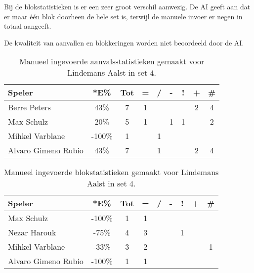 Bij de blokstatistieken is er een zeer groot verschil aanwezig. De AI geeft aan dat er maar één blok doorheen de hele set is, terwijl de manuele invoer er negen in totaal aangeeft.

De kwaliteit van aanvallen en blokkeringen worden niet beoordeeld door de AI. 

\begin{table}[ht!]
    \centering
    \scriptsize
    \begin{tabular}{|l|c|c|c|c|c|c|c|c|}
        \hline
        \textbf{Speler} & *E\% & Tot & = & / & - & ! & + & \# \\ \hline
        Berre Peters & 43\% & 7 & 1 &  &  & & 2 & 4 \\ 
        Max Schulz & 20\% & 5 & 1 &  & 1 & 1 & & 2 \\ 
        Mihkel Varblane & -100\% & 1 &  & 1 &  &  &  & \\ 
        Alvaro Gimeno Rubio & 43\% & 7 &  & 1 & & & 2 & 4 \\ \hline
    \end{tabular}
    \caption[Manueel ingevoerde aanvalsstatistieken gemaakt Lindemans Aalst in set 4]{\label{tab:PL3AttAalstMan4}Manueel ingevoerde aanvalsstatistieken gemaakt voor Lindemans Aalst in set 4.}
\end{table}

\begin{table}[ht!]
    \centering
    \scriptsize
    \begin{tabular}{|l|c|c|c|c|c|c|c|c|}
        \hline
        \textbf{Speler} & *E\% & Tot & = & / & - & ! & + & \# \\ \hline
        Max Schulz & -100\% & 1 & 1 &  &  &  &  & \\
        Nezar Harouk & -75\% & 4 & 3 & &  & 1 &  & \\ 
        Mihkel Varblane & -33\% & 3 & 2 &  &  & &  & 1 \\ 
        Alvaro Gimeno Rubio & -100\% & 1 & 1 &  &  &  &  & \\  \hline
    \end{tabular}
    \caption[Manueel ingevoerde blokstatistieken gemaakt Lindemans Aalst in set 4]{\label{tab:PL3BlockAalstMan4}Manueel ingevoerde blokstatistieken gemaakt voor Lindemans Aalst in set 4.}
\end{table}

